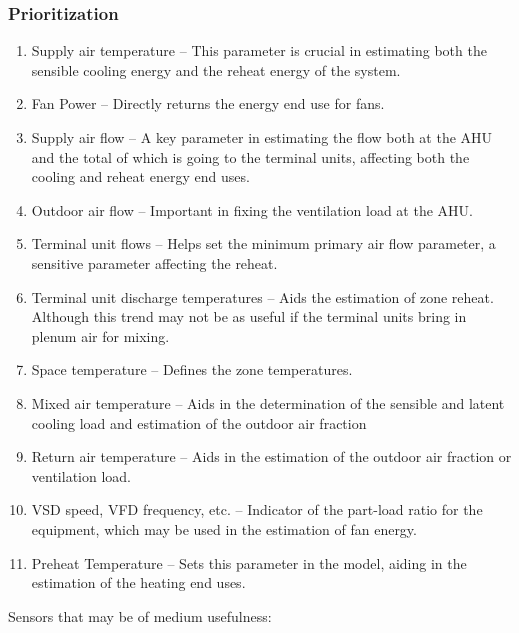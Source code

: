 \subsubsection{Prioritization} \label{sec:Prioritization}
\begin{enumerate}
\item Supply air temperature -- This parameter is crucial in estimating both the sensible cooling energy and the reheat energy of the system. 
\item Fan Power -- Directly returns the energy end use for fans.
\item Supply air flow -- A key parameter in estimating the flow both at the AHU and the total of which is going to the terminal units, affecting both the cooling and reheat energy end uses.
\item Outdoor air flow -- Important in fixing the ventilation load at the AHU.
\item Terminal unit flows -- Helps set the minimum primary air flow parameter, a sensitive parameter affecting the reheat. 
\item Terminal unit discharge temperatures -- Aids the estimation of
    zone reheat. Although this trend may not be as useful if the
    terminal units bring in plenum air for mixing. 
\item Space temperature -- Defines the zone temperatures. 
\item Mixed air temperature -- Aids in the determination of the sensible
    and latent cooling load and estimation of the outdoor air fraction
\item Return air temperature -- Aids in the estimation of the outdoor air fraction or ventilation load.
\item VSD speed, VFD frequency, etc. -- Indicator of the part-load ratio for the equipment, which may be used in the estimation of fan energy. 
\item Preheat Temperature -- Sets this parameter in the model, aiding in the estimation of the heating end uses.
\end{enumerate}

Sensors that may be of medium usefulness:

